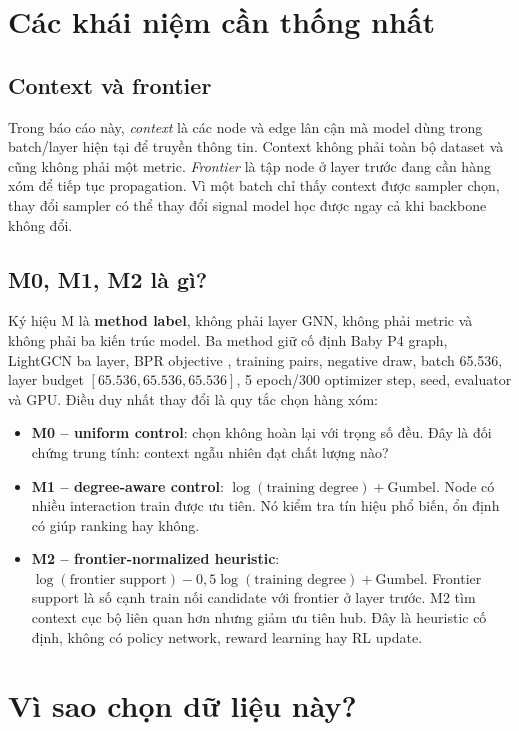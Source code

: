 \documentclass[12pt,a4paper]{article}
\begin{document}
\section{Các khái niệm cần thống nhất}
\subsection{Context và frontier}
Trong báo cáo này, \emph{context} là các node và edge lân cận mà model dùng trong batch/layer hiện tại để truyền thông tin. Context không phải toàn bộ dataset và cũng không phải một metric. \emph{Frontier} là tập node ở layer trước đang cần hàng xóm để tiếp tục propagation. Vì một batch chỉ thấy context được sampler chọn, thay đổi sampler có thể thay đổi signal model học được ngay cả khi backbone không đổi.

\subsection{M0, M1, M2 là gì?}
Ký hiệu M là \textbf{method label}, không phải layer GNN, không phải metric và không phải ba kiến trúc model. Ba method giữ cố định Baby P4 graph, LightGCN ba layer, BPR objective \cite{bpr}, training pairs, negative draw, batch 65.536, layer budget $[65.536,65.536,65.536]$, 5 epoch/300 optimizer step, seed, evaluator và GPU. Điều duy nhất thay đổi là quy tắc chọn hàng xóm:

\begin{itemize}
  \item \textbf{M0 -- uniform control}: chọn không hoàn lại với trọng số đều. Đây là đối chứng trung tính: context ngẫu nhiên đạt chất lượng nào?
  \item \textbf{M1 -- degree-aware control}: $\log(\text{training degree})+\text{Gumbel}$. Node có nhiều interaction train được ưu tiên. Nó kiểm tra tín hiệu phổ biến, ổn định có giúp ranking hay không.
  \item \textbf{M2 -- frontier-normalized heuristic}: $\log(\text{frontier support})-0,5\log(\text{training degree})+\text{Gumbel}$. Frontier support là số cạnh train nối candidate với frontier ở layer trước. M2 tìm context cục bộ liên quan hơn nhưng giảm ưu tiên hub. Đây là heuristic cố định, không có policy network, reward learning hay RL update.
\end{itemize}

\section{Vì sao chọn dữ liệu này?}
\end{document}
